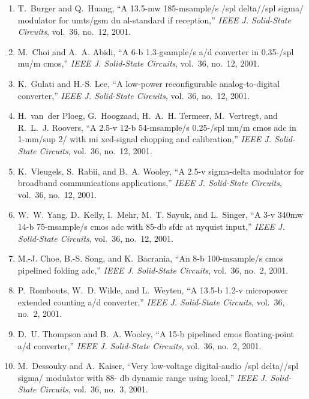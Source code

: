 \begin{enumerate}
\item
T.~Burger and Q.~Huang, ``A 13.5-mw 185-msample/s /spl delta//spl sigma/
  modulator for umts/gsm du al-standard if reception,'' \emph{{IEEE} J.
  Solid-State Circuits}, vol.~36, no.~12, 2001.

\item
M.~Choi and A.~A. Abidi, ``A 6-b 1.3-gsample/s a/d converter in 0.35-/spl mu/m
  cmos,'' \emph{{IEEE} J. Solid-State Circuits}, vol.~36, no.~12, 2001.

\item
K.~Gulati and H.-S. Lee, ``A low-power reconfigurable analog-to-digital
  converter,'' \emph{{IEEE} J. Solid-State Circuits}, vol.~36, no.~12, 2001.

\item
H.~van~der Ploeg, G.~Hoogzaad, H.~A.~H. Termeer, M.~Vertregt, and R.~L.~J.
  Roovers, ``A 2.5-v 12-b 54-msample/s 0.25-/spl mu/m cmos adc in 1-mm/sup 2/
  with mi xed-signal chopping and calibration,'' \emph{{IEEE} J. Solid-State
  Circuits}, vol.~36, no.~12, 2001.

\item
K.~Vleugels, S.~Rabii, and B.~A. Wooley, ``A 2.5-v sigma-delta modulator for
  broadband communications applications,'' \emph{{IEEE} J. Solid-State
  Circuits}, vol.~36, no.~12, 2001.

\item
W.~W. Yang, D.~Kelly, I.~Mehr, M.~T. Sayuk, and L.~Singer, ``A 3-v 340mw 14-b
  75-msample/s cmos adc with 85-db sfdr at nyquist input,'' \emph{{IEEE} J.
  Solid-State Circuits}, vol.~36, no.~12, 2001.

\item
M.-J. Choe, B.-S. Song, and K.~Bacrania, ``An 8-b 100-msample/s cmos pipelined
  folding adc,'' \emph{{IEEE} J. Solid-State Circuits}, vol.~36, no.~2, 2001.

\item
P.~Rombouts, W.~D. Wilde, and L.~Weyten, ``A 13.5-b 1.2-v micropower extended
  counting a/d converter,'' \emph{{IEEE} J. Solid-State Circuits}, vol.~36,
  no.~2, 2001.

\item
D.~U. Thompson and B.~A. Wooley, ``A 15-b pipelined cmos floating-point a/d
  converter,'' \emph{{IEEE} J. Solid-State Circuits}, vol.~36, no.~2, 2001.

\item
M.~Dessouky and A.~Kaiser, ``Very low-voltage digital-audio /spl delta//spl
  sigma/ modulator with 88- db dynamic range using local,'' \emph{{IEEE} J.
  Solid-State Circuits}, vol.~36, no.~3, 2001.


\end{enumerate}
